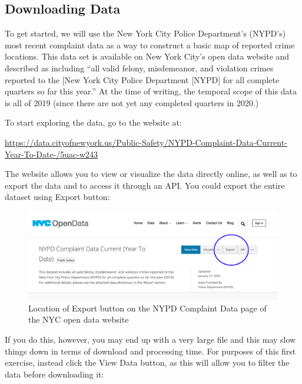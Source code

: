 \documentclass[]{book}
\begin{document}
\hypertarget{downloading-data}{%
\subsection{Downloading Data}\label{downloading-data}}

To get started, we will use the New York City Police Department's (NYPD's) most recent complaint data as a way to construct a basic map of reported crime locations. This data set is available on New York City's open data website and described as including ``all valid felony, misdemeanor, and violation crimes reported to the {[}New York City Police Department {[}NYPD{]} for all complete quarters so far this year.'' At the time of writing, the temporal scope of this data is all of 2019 (since there are not yet any completed quarters in 2020.)

To start exploring the data, go to the website at:

\url{https://data.cityofnewyork.us/Public-Safety/NYPD-Complaint-Data-Current-Year-To-Date-/5uac-w243}

The website allows you to view or visualize the data directly online, as well as to export the data and to access it through an API. You could export the entire dataset using Export button:

\begin{figure}
\centering
\includegraphics{images/NYPD_CD_main.png}
\caption{Location of Export button on the NYPD Complaint Data page of the NYC open data website}
\end{figure}

If you do this, however, you may end up with a very large file and this may slow things down in terms of download and processing time. For purposes of this first exercise, instead click the View Data button, as this will allow you to filter the data before downloading it:
\end{document}
